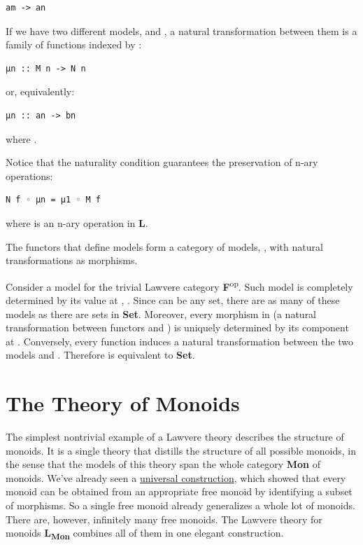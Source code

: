 \begin{Verbatim}[commandchars=\\\{\}]
am -> an
\end{Verbatim}

If we have two different models,  and , a natural
transformation between them is a family of functions indexed by
:

\begin{Verbatim}[commandchars=\\\{\}]
μn :: M n -> N n
\end{Verbatim}

or, equivalently:

\begin{Verbatim}[commandchars=\\\{\}]
μn :: an -> bn
\end{Verbatim}

where .

Notice that the naturality condition guarantees the preservation of
n-ary operations:

\begin{Verbatim}[commandchars=\\\{\}]
N f ◦ μn = μ1 ◦ M f
\end{Verbatim}

where  is an n-ary operation in
\textbf{L}.

The functors that define models form a category of models,
, with natural transformations as morphisms.

Consider a model for the trivial Lawvere category
\textbf{F}\textsuperscript{op}. Such model is completely determined by
its value at , . Since  can be any
set, there are as many of these models as there are sets in
\textbf{Set}. Moreover, every morphism in  (a
natural transformation between functors  and ) is
uniquely determined by its component at . Conversely, every
function  induces a natural
transformation between the two models  and .
Therefore  is equivalent to \textbf{Set}.

\section{The Theory of Monoids}\label{the-theory-of-monoids}

The simplest nontrivial example of a Lawvere theory describes the
structure of monoids. It is a single theory that distills the structure
of all possible monoids, in the sense that the models of this theory
span the whole category \textbf{Mon} of monoids. We've already seen a
\href{https://bartoszmilewski.com/2015/07/21/free-monoids/}{universal
construction}, which showed that every monoid can be obtained from an
appropriate free monoid by identifying a subset of morphisms. So a
single free monoid already generalizes a whole lot of monoids. There
are, however, infinitely many free monoids. The Lawvere theory for
monoids \textbf{L\textsubscript{Mon}} combines all of them in one
elegant construction.

